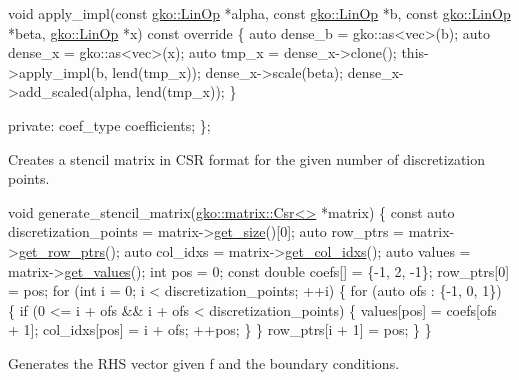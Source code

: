 \begin{DoxyCode}
    \textcolor{keywordtype}{void} apply\_impl(\textcolor{keyword}{const} \hyperlink{classgko_1_1LinOp}{gko::LinOp} *alpha, \textcolor{keyword}{const} \hyperlink{classgko_1_1LinOp}{gko::LinOp} *b,
                    \textcolor{keyword}{const} \hyperlink{classgko_1_1LinOp}{gko::LinOp} *beta, \hyperlink{classgko_1_1LinOp}{gko::LinOp} *x)\textcolor{keyword}{ const override}
\textcolor{keyword}{    }\{
        \textcolor{keyword}{auto} dense\_b = gko::as<vec>(b);
        \textcolor{keyword}{auto} dense\_x = gko::as<vec>(x);
        \textcolor{keyword}{auto} tmp\_x = dense\_x->clone();
        this->apply\_impl(b, lend(tmp\_x));
        dense\_x->scale(beta);
        dense\_x->add\_scaled(alpha, lend(tmp\_x));
    \}

\textcolor{keyword}{private}:
    coef\_type coefficients;
\};
\end{DoxyCode}


Creates a stencil matrix in C\+SR format for the given number of discretization points.


\begin{DoxyCode}
\textcolor{keywordtype}{void} generate\_stencil\_matrix(\hyperlink{classgko_1_1matrix_1_1Csr}{gko::matrix::Csr<>} *matrix)
\{
    \textcolor{keyword}{const} \textcolor{keyword}{auto} discretization\_points = matrix->\hyperlink{classgko_1_1LinOp_a31b3c003388eb0b95393154f68c2b98d}{get\_size}()[0];
    \textcolor{keyword}{auto} row\_ptrs = matrix->\hyperlink{classgko_1_1matrix_1_1Csr_a068e5158cf282fa977f0a137f8cd7f03}{get\_row\_ptrs}();
    \textcolor{keyword}{auto} col\_idxs = matrix->\hyperlink{classgko_1_1matrix_1_1Csr_a81c6294177a1be4873804c8a85a9fc64}{get\_col\_idxs}();
    \textcolor{keyword}{auto} values = matrix->\hyperlink{classgko_1_1matrix_1_1Csr_a929b0a194e6aeb1252b8e6781d162e83}{get\_values}();
    \textcolor{keywordtype}{int} pos = 0;
    \textcolor{keyword}{const} \textcolor{keywordtype}{double} coefs[] = \{-1, 2, -1\};
    row\_ptrs[0] = pos;
    \textcolor{keywordflow}{for} (\textcolor{keywordtype}{int} i = 0; i < discretization\_points; ++i) \{
        \textcolor{keywordflow}{for} (\textcolor{keyword}{auto} ofs : \{-1, 0, 1\}) \{
            \textcolor{keywordflow}{if} (0 <= i + ofs && i + ofs < discretization\_points) \{
                values[pos] = coefs[ofs + 1];
                col\_idxs[pos] = i + ofs;
                ++pos;
            \}
        \}
        row\_ptrs[i + 1] = pos;
    \}
\}
\end{DoxyCode}


Generates the R\+HS vector given {\ttfamily f} and the boundary conditions.


